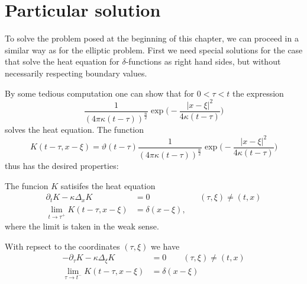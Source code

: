 %
%
%
\section{Particular solution}
To solve the problem posed at the beginning of this chapter, we can
proceed in a similar way as for the elliptic problem.
First we need special solutions for the case that solve the heat
equation for $\delta$-functions as right hand sides, but without
necessarily respecting boundary values.

By some tedious computation one can show that for $0<\tau<t$
the expression
\[
\frac1{(4\pi\kappa(t-\tau))^{\frac{n}2}}
\exp\biggl(-\frac{|x-\xi|^2}{4\kappa(t-\tau)}\biggr)
\]
solves the heat equation.
The function
\begin{equation}
K(t-\tau, x-\xi)
=
\vartheta(t-\tau)
\frac1{(4\pi\kappa(t-\tau))^{\frac{n}2}}
\exp\biggl(-\frac{|x-\xi|^2}{4\kappa(t-\tau)}\biggr)
\label{parabolischsingulaer}
\end{equation}
thus has the desired properties:

\begin{satz}
The funcion $K$ satisifes the heat equation
\begin{align*}
\partial_tK-\kappa\Delta_xK&=0&&(\tau, \xi)\ne(t,x)
\\
\lim_{t\to\tau^+}K(t-\tau, x-\xi)&=\delta(x-\xi),
\end{align*}
where the limit is taken in the weak sense.

With repsect to the coordinates $(\tau,\xi)$ we have
\begin{align*}
-\partial_{\tau} K-\kappa\Delta_{\xi}K&=0\qquad(\tau,\xi)\ne(t,x)
\\
\lim_{\tau\to t^-}K(t-\tau, x-\xi)&=\delta(x-\xi)
\end{align*}
\end{satz}

